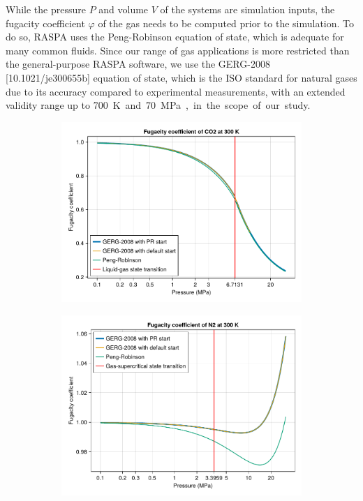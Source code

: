 \documentclass[main.tex]{subfiles}
\begin{document}
While the pressure $P$ and volume $V$ of the systems are simulation inputs, the fugacity coefficient $\varphi$ of the gas needs to be computed prior to the simulation. To do so, RASPA uses the Peng-Robinson equation of state, which is adequate for many common fluids. Since our range of gas applications is more restricted than the general-purpose RASPA software, we use the GERG-2008 [10.1021/je300655b] equation of state, which is the ISO standard for natural gases due to its accuracy compared to experimental measurements, with an extended validity range up to \qty{700}K and \qty{70}{MPa}, in the scope of our study.

\begin{figure}
	\centering
	\begin{subfigure}{0.5\columnwidth}
		\includegraphics[width=\columnwidth]{figures/gcmc/fugacity.pdf}
		\label{fugacityCO2}
	\end{subfigure}\hfill%
	\begin{subfigure}{0.5\columnwidth}
		\includegraphics[width=\columnwidth]{figures/gcmc/fugacity_N2.pdf}
	\end{subfigure}


\end{figure}
\end{document}
